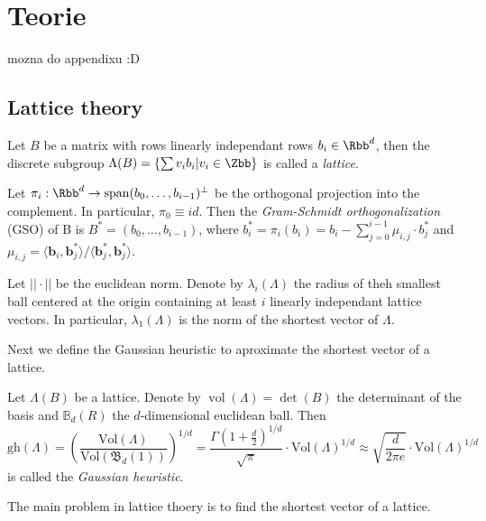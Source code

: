 \chapter{Teorie}


mozna do appendixu :D
\section{Lattice theory}
\begin{definition}
    Let $B$ be a matrix with rows linearly independant rows $b_i \in \Rbb^d$, then the discrete subgroup $\Lambda(B) = \{\sum v_i b_i | v_i \in \Zbb\}$ is called a \textit{lattice}.   
\end{definition}

Let $\pi_i : \Rbb^d \to \operatorname{span}(b_0, \ldots, b_{i-1})^\perp$ be the orthogonal projection into the complement. In particular, $\pi_0 \equiv id$. Then the \textit{Gram-Schmidt orthogonalization} (GSO) of B is $B^* = (b_0, \ldots, b_{i-1})$, where $b^*_i = \pi_i(b_i) = b_i - \sum_{j=0}^{i-1} \mu_{i,j} \cdot b_j^*$ and $\mu_{i,j} = \langle \boldsymbol{b}_i, \boldsymbol{b}_j^* \rangle / \langle \boldsymbol{b}_j^*, \boldsymbol{b}_j^* \rangle$. 

Let $|| \cdot ||$ be the euclidean norm. Denote by $\lambda_i(\Lambda)$ the radius of theh smallest ball centered at the origin containing at least $i$ linearly independant lattice vectors. In particular, $\lambda_1(\Lambda)$ is the norm of the shortest vector of $\Lambda$.

Next we define the Gaussian heuristic to aproximate the shortest vector of a lattice.

\begin{definition}
    Let $\Lambda(B)$ be a lattice. Denote by $\operatorname*{vol}(\Lambda) = \operatorname*{det}(B)$ the determinant of the basis and $\mathbb{B}_d(R)$ the $d$-dimensional euclidean ball. Then 
    \begin{equation*}
        \mathrm{gh}(\Lambda) = \left(\frac{\mathrm{Vol}(\Lambda)}{\mathrm{Vol}(\mathfrak{B}_d(1))}\right)^{1/d} = \frac{\Gamma\left(1+\frac{d}{2}\right)^{1/d}}{\sqrt{\pi}} \cdot \mathrm{Vol}(\Lambda)^{1/d} \approx \sqrt{\frac{d}{2\pi e}} \cdot \mathrm{Vol}(\Lambda)^{1/d}
    \end{equation*}
    is called the \textit{Gaussian heuristic}.
\end{definition}

The main problem in lattice thoery is to find the shortest vector of a lattice.


